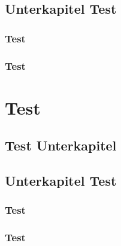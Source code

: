\documentclass[11pt]{article}
\begin{document}
\subsection{Unterkapitel Test}
\lipsum
\subsubsection{Test}
\lipsum
\subsubsection{Test}
\lipsum
\section{Test}
\subsection{Test Unterkapitel}
\lipsum
\subsection{Unterkapitel Test}
\lipsum
\subsubsection{Test}
\lipsum
\subsubsection{Test}
\lipsum
\end{document}
